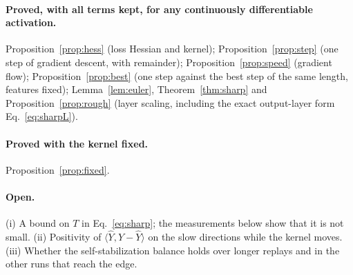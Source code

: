 \documentclass[11pt]{article}
\theoremstyle{definition}
\theoremstyle{remark}
\newcommand{\ip}[2]{\langle #1,#2\rangle}
\begin{document}
\paragraph{Proved, with all terms kept, for any continuously differentiable activation.}
Proposition~\ref{prop:hess} (loss Hessian and kernel); Proposition~\ref{prop:step} (one step of gradient descent, with remainder); Proposition~\ref{prop:speed} (gradient flow); Proposition~\ref{prop:best} (one step against the best step of the same length, features fixed); Lemma~\ref{lem:euler}, Theorem~\ref{thm:sharp} and Proposition~\ref{prop:rough} (layer scaling, including the exact output-layer form Eq.~\eqref{eq:sharpL}).

\paragraph{Proved with the kernel fixed.} Proposition~\ref{prop:fixed}.

\paragraph{Open.}
(i) A bound on $T$ in Eq.~\eqref{eq:sharp}; the measurements below show that it is not small.
(ii) Positivity of $\ip{\hat Y}{Y - \hat Y}$ on the slow directions while the kernel moves.
(iii) Whether the self-stabilization balance holds over longer replays and in the other runs that reach the edge.
\end{document}
